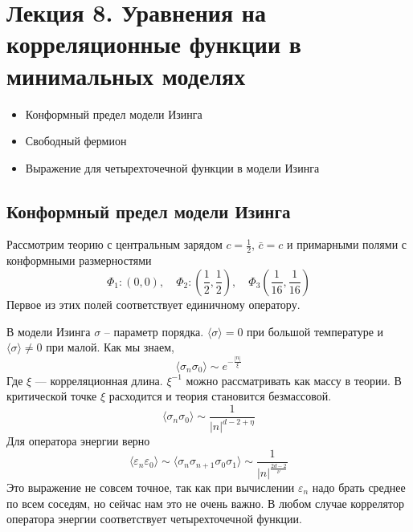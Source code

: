 \documentclass[a4paper,12pt]{article}
\theoremstyle{definition}
\theoremstyle{definition}
\theoremstyle{definition}
\begin{document}
\section{Лекция 8. Уравнения на корреляционные функции в минимальных моделях}
\label{sec:lecture-7}
  \begin{itemize}
  \item Конформный предел модели Изинга
  \item Свободный фермион
  \item Выражение для четырехточечной функции в модели Изинга
  \end{itemize}

\subsection{Конформный предел модели Изинга}
\label{sec:ising-conformal-limit}

Рассмотрим теорию с центральным зарядом $c=\frac{1}{2}$, $\bar c=c$ и примарными полями с
конформными размерностями
\begin{equation}
  \label{eq:276}
  \Phi_{1}: (0,0),\quad \Phi_{2}: \left(\frac{1}{2},\frac{1}{2}\right),\quad \Phi_{3}\left(\frac{1}{16},\frac{1}{16}\right)
\end{equation}
Первое из этих полей соответствует единичному оператору. 

В модели Изинга $\sigma$ -- параметр порядка. $\langle\sigma\rangle=0$ при большой температуре и $\langle \sigma\rangle\neq 0$ при малой. Как мы знаем,
\begin{equation}
  \label{eq:277}
  \langle \sigma_{n} \sigma_{0}\rangle\sim e^{-\frac{|n|}{\xi}}
\end{equation}
Где $\xi$ --- корреляционная длина. $\xi^{-1}$ можно рассматривать как массу в теории. В критической точке $\xi$ расходится и теория становится безмассовой.
\begin{equation}
  \label{eq:278}
  \langle\sigma_{n}\sigma_{0}\rangle\sim\frac{1}{|n|^{d-2+\eta}}
\end{equation}
Для оператора энергии верно
\begin{equation}
  \label{eq:279}
  \langle \varepsilon_{n} \varepsilon_{0}\rangle \sim \langle\sigma_{n}\sigma_{n+1}\sigma_{0}\sigma_{1}\rangle\sim\frac{1}{|n|^{\frac{2d-2}{\nu}}}
\end{equation}
Это выражение не совсем точное, так как при вычислении $\varepsilon_{n}$ надо брать среднее по всем соседям, но сейчас нам это не очень важно. В любом случае коррелятор оператора энергии соответствует четырехточечной функции. 
\end{document}
